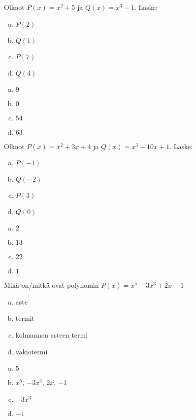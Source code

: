 \begin{tehtava}
    Olkoot $P(x)=x^2+5$ ja $Q(x)=x^3-1$. Laske:
    \begin{enumerate}[a)]
        \item $P(2)$
        \item $Q(1)$
        \item $P(7)$
        \item $Q(4)$
    \end{enumerate}
    \begin{vastaus}
        \begin{enumerate}[a)]
            \item $9$
            \item $0$
            \item $54$
            \item $63$
        \end{enumerate}
    \end{vastaus}
\end{tehtava}

\begin{tehtava}
    Olkoot $P(x)=x^2+3x+4$ ja $Q(x)=x^3-10x+1$. Laske:
    \begin{enumerate}[a)]
        \item $P(-1)$
        \item $Q(-2)$
        \item $P(3)$
        \item $Q(0)$
    \end{enumerate}
    \begin{vastaus}
        \begin{enumerate}[a)]
            \item $2$
            \item $13$
            \item $22$
            \item $1$
        \end{enumerate}
    \end{vastaus}
\end{tehtava}

\begin{tehtava}
	Mikä on/mitkä ovat polynomin $P(x) = x^5-3x^3+2x-1$
	\begin{enumerate}[a)]
		\item aste
		\item termit
		\item kolmannen asteen termi
		\item vakiotermi
	\end{enumerate}

	\begin{vastaus}
		\begin{enumerate}[a)]
			\item $5$
			\item $x^5$, $-3x^3$, $2x$, $-1$
			\item $-3x^3$
			\item $-1$
		\end{enumerate}
	\end{vastaus}
\end{tehtava}

